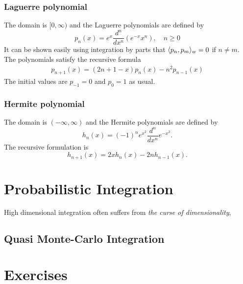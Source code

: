 \subsubsection{Laguerre polynomial} The domain is $[0,\infty)$ and the Laguerre polynomials are defined by 
\begin{equation}
    p_n(x) = e^x \frac{d^n }{dx^n} (e^{-x} x^n), \quad n\ge 0
\end{equation}
It can be shown easily using integration by parts that $\langle {p_n, p_m} \rangle_w = 0$ if $n\neq m$. The polynomials satisfy the recursive formula 
\begin{eqnarray}
    p_{n+1}(x) = (2 n + 1 - x) p_n(x)-n^2 p_{n-1}(x) 
\end{eqnarray}
The initial values are $p_{-1} = 0$ and $p_0=1$ as usual. 

\subsubsection{Hermite polynomial} The domain is $(-\infty, \infty)$ and the Hermite polynomials are defined by 
\begin{equation}
    h_{n}(x) = (-1)^n e^{x^2} \frac{d^n}{d x^n} e^{-x^2}.
\end{equation}
The recursive formulation is 
$$h_{n+1}(x) = 2x h_n(x) - 2n h_{n-1}(x).$$




\section{Probabilistic Integration}
High dimensional integration often suffers from \emph{the curse of dimensionality}, 
\subsection{Quasi Monte-Carlo Integration}

\section{Exercises}
